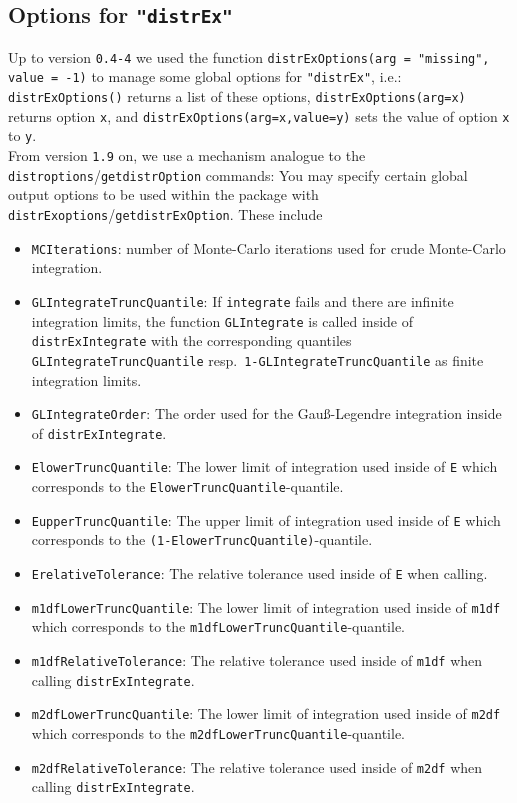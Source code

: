 \documentclass[11pt]{article}
\newcommand{\code}[1]{{\tt #1}}
\newcommand{\pkg}[1]{{\tt "#1"}}
\begin{document}
\subsection[Options for distrEx]{Options for \pkg{distrEx}}\label{distrExoptions}
Up to version {\tt 0.4-4} we used the function
 \code{distrExOptions(arg = "missing", value = -1)} to manage some global
 options for \pkg{distrEx}, i.e.:\\
\code{distrExOptions()} returns a list of these options,
\code{distrExOptions(arg=x)} returns option \code{x}, and
\code{distrExOptions(arg=x,value=y)} sets the value of option \code{x} to
 {\tt y}.\\
 From version {\tt 1.9} on, we use a mechanism analogue to the
  \code{distroptions}/\code{getdistrOption} commands:
You may specify certain
global output options to be used within the package with
 \code{distrExoptions}/\code{getdistrExOption}. These include
\begin{itemize}
  \item \code{MCIterations}: number of Monte-Carlo iterations used for crude
          Monte-Carlo integration.
  \item \code{GLIntegrateTruncQuantile}: If \code{integrate} fails and there are
          infinite integration limits, the function \code{GLIntegrate} is
          called inside of \code{distrExIntegrate} with the corresponding
          quantiles  \code{GLIntegrateTruncQuantile} resp.\
          \code{1-GLIntegrateTruncQuantile} as finite integration limits.
  \item \code{GLIntegrateOrder}: The order used for the Gau{\ss{}}-Legendre
          integration inside of \code{distrExIntegrate}.
  \item \code{ElowerTruncQuantile}: The lower limit of integration used inside
       of \code{E} which corresponds to the \code{ElowerTruncQuantile}-quantile.
  \item \code{EupperTruncQuantile}: The upper limit of integration used inside
          of \code{E} which corresponds to the
          \code{(1-ElowerTruncQuantile)}-quantile.
  \item \code{ErelativeTolerance}: The relative tolerance used inside of
        \code{E} when calling\linebreak[4] \code{distrExIntegrate}.
  \item \code{m1dfLowerTruncQuantile}: The lower limit of integration used
        inside of \code{m1df} which corresponds to the
          \code{m1dfLowerTruncQuantile}-quantile.
  \item \code{m1dfRelativeTolerance}: The relative tolerance used inside of
          \code{m1df} when calling \code{distrExIntegrate}.
  \item \code{m2dfLowerTruncQuantile}: The lower limit of integration used
        inside of \code{m2df} which corresponds to the
          \code{m2dfLowerTruncQuantile}-quantile.
  \item \code{m2dfRelativeTolerance}: The relative tolerance used inside of
          \code{m2df} when calling \code{distrExIntegrate}.
\end{itemize}
\end{document}
